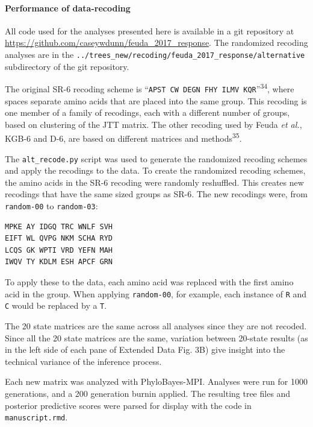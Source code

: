 \documentclass[]{article}
\let\oldparagraph\paragraph
\renewcommand{\paragraph}[1]{\oldparagraph{#1}\mbox{}}
\begin{document}
\hypertarget{performance-of-data-recoding}{%
\paragraph{Performance of
data-recoding}\label{performance-of-data-recoding}}

All code used for the analyses presented here is available in a git
repository at \url{https://github.com/caseywdunn/feuda_2017_response}.
The randomized recoding analyses are in the
\texttt{../trees\_new/recoding/feuda\_2017\_response/alternative}
subdirectory of the git repository.

The original SR-6 recoding scheme is
``\texttt{APST\ CW\ DEGN\ FHY\ ILMV\ KQR}''\textsuperscript{34}, where
spaces separate amino acids that are placed into the same group. This
recoding is one member of a family of recodings, each with a different
number of groups, based on clustering of the JTT matrix. The other
recoding used by Feuda \emph{et al.}, KGB-6 and D-6, are based on
different matrices and methods\textsuperscript{35}.

The \texttt{alt\_recode.py} script was used to generate the randomized
recoding schemes and apply the recodings to the data. To create the
randomized recoding schemes, the amino acids in the SR-6 recoding were
randomly reshuffled. This creates new recodings that have the same sized
groups as SR-6. The new recodings were, from \texttt{random-00} to
\texttt{random-03}:

\begin{verbatim}
MPKE AY IDGQ TRC WNLF SVH
EIFT WL QVPG NKM SCHA RYD
LCQS GK WPTI VRD YEFN MAH
IWQV TY KDLM ESH APCF GRN
\end{verbatim}

To apply these to the data, each amino acid was replaced with the first
amino acid in the group. When applying \texttt{random-00}, for example,
each instance of \texttt{R} and \texttt{C} would be replaced by a
\texttt{T}.

The 20 state matrices are the same across all analyses since they are
not recoded. Since all the 20 state matrices are the same, variation
between 20-state results (as in the left side of each pane of Extended
Data Fig. 3B) give insight into the technical variance of the inference
process.

Each new matrix was analyzed with PhyloBayes-MPI. Analyses were run for
1000 generations, and a 200 generation burnin applied. The resulting
tree files and posterior predictive scores were parsed for display with
the code in \texttt{manuscript.rmd}.
\end{document}
